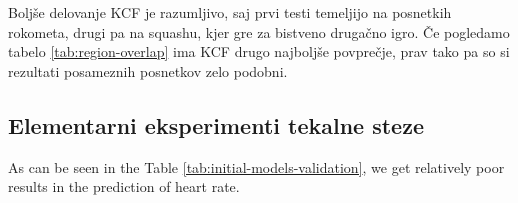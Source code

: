 Boljše delovanje KCF je razumljivo, saj prvi testi temeljijo na posnetkih rokometa, drugi pa na squashu, kjer gre za bistveno drugačno igro. Če pogledamo tabelo \ref{tab:region-overlap} ima KCF drugo najboljše povprečje, prav tako pa so si rezultati posameznih posnetkov zelo podobni. 


















\subsection{Elementarni eksperimenti tekalne steze}
As can be seen in the Table \ref{tab:initial-models-validation}, we get relatively poor results in the prediction of heart rate.

